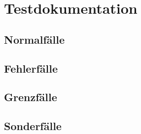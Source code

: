 \chapter{Testdokumentation}\label{ch:testdokumentation}


\section{Normalfälle}\label{sec:normalfaelle}
\section{Fehlerfälle}\label{sec:fehlerfaelle}
\section{Grenzfälle}\label{sec:grenzfaelle}
\section{Sonderfälle}\label{sec:sonderfaelle}
